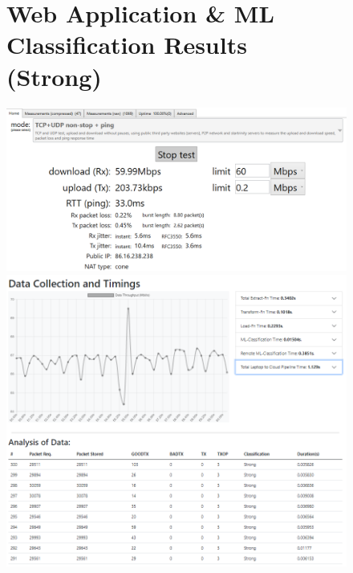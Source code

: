 \begin{figure}
\begin{minipage}{\linewidth}
\section{Web Application \& ML Classification Results (Strong)}
    \centering
    \includegraphics[width=1\linewidth]{images/60mbps.PNG}
    \includegraphics[width=1\linewidth]{images/strong.PNG}
    \label{appendix:StrongData}
\end{minipage}
\end{figure}

